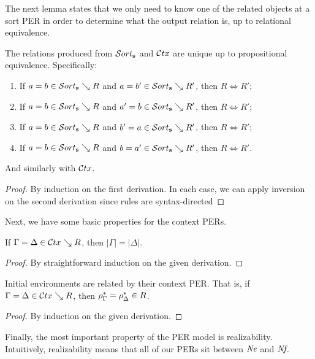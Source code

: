 

The next lemma states that we only need to know one of the related objects at a sort PER in order to determine what the output relation is, up to relational equivalence.

\begin{lemma}
  The relations produced from $\persort$ and $\mathcal{C}tx$ are unique up to propositional equivalence.
  Specifically:
  \begin{enumerate}
  \item If $a = b \in \persort \searrow R$ and $a = b' \in \persort \searrow R'$, then $R \iff R'$;
  \item If $a = b \in \persort \searrow R$ and $a' = b \in \persort \searrow R'$, then $R \iff R'$;
  \item If $a = b \in \persort \searrow R$ and $b' = a \in \persort \searrow R'$, then $R \iff R'$;
  \item If $a = b \in \persort \searrow R$ and $b = a' \in \persort \searrow R'$, then $R \iff R'$.
  \end{enumerate}
  And similarly with $\mathcal{C}tx$.
\end{lemma}
\begin{proof}
  By induction on the first derivation.
  In each case, we can apply inversion on the second derivation since rules are syntax-directed
\end{proof}

Next, we have some basic properties for the context PERs.

\begin{lemma}
  If $\Gamma = \Delta \in \mathcal{C}tx \searrow R$, then $|\Gamma| = |\Delta|$.
\end{lemma}
\begin{proof}
  By straightforward induction on the given derivation.
\end{proof}

\begin{lemma}
  \label{lem:initenv}
  Initial environments are related by their context \ac{PER}.
  That is, if $\Gamma = \Delta \in \mathcal{C}tx \searrow R$, then $\rho^*_{\Gamma} = \rho^*_{\Delta} \in R$.
\end{lemma}
\begin{proof}
  By induction on the given derivation.
\end{proof}

Finally, the most important property of the PER model is realizability.
Intuitively, realizability means that all of our PERs sit between ${\normalfont\textit{Ne}}$ and ${\normalfont\textit{Nf}}$.

